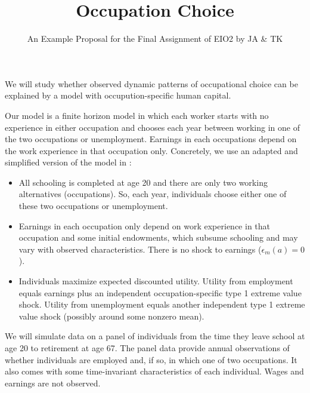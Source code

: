 \documentclass[fleqn,12pt]{article}
\title{Occupation Choice}
\author{An Example Proposal for the Final Assignment of EIO2 by JA \& TK}
\date{}
\begin{document}
\maketitle

We will study whether observed dynamic patterns of occupational choice can be explained by a model with occupution-specific human capital.

Our model is a finite horizon model in which each worker starts with no experience in either occupation and chooses each year between working in one of the two occupations or unemployment. Earnings in each occupations depend on the work experience in that occupation only. Concretely, we use an adapted and simplified version of the model in \citet[][Section I]{jpe97:ecksteinwolpin}:
\begin{itemize}
\item All schooling is completed at age 20 and there are only two working alternatives (occupations). So, each year, individuals choose either one of these two occupations or unemployment.
\item Earnings in each occupation only depend on work experience in that occupation and some initial endowments, which subsume schooling and may vary with observed characteristics. There is no shock to earnings ($\epsilon_m(a)=0$).
\item Individuals maximize expected discounted utility. Utility from employment equals earnings plus an independent occupation-specific type 1 extreme value shock. Utility from unemployment equals another independent type 1 extreme value shock (possibly around some nonzero mean).
\end{itemize}

We will simulate data on a panel of individuals from the time they leave school at age 20 to retirement at age 67. The panel data provide annual observations of whether individuals are employed and, if so, in which one of two occupations. It also comes with some time-invariant characteristics of each individual. Wages and earnings are not observed. 




\end{document}
